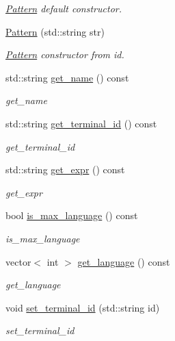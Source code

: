 \begin{DoxyCompactItemize}
\begin{DoxyCompactList}\small\item\em \hyperlink{class_pattern}{Pattern} default constructor. \end{DoxyCompactList}\item 
\hyperlink{class_pattern_a13a6b021ad96f605132817bc09067fb5}{Pattern} (std\+::string str)
\begin{DoxyCompactList}\small\item\em \hyperlink{class_pattern}{Pattern} constructor from id. \end{DoxyCompactList}\item 
std\+::string \hyperlink{class_pattern_a46de2634013b74dd9eb6c5b4b9221207}{get\+\_\+name} () const 
\begin{DoxyCompactList}\small\item\em get\+\_\+name \end{DoxyCompactList}\item 
std\+::string \hyperlink{class_pattern_a70a07c4f18a44547451a7a31cb4f559b}{get\+\_\+terminal\+\_\+id} () const 
\begin{DoxyCompactList}\small\item\em get\+\_\+terminal\+\_\+id \end{DoxyCompactList}\item 
std\+::string \hyperlink{class_pattern_aae66f42063f4f6eac934995201f77a64}{get\+\_\+expr} () const 
\begin{DoxyCompactList}\small\item\em get\+\_\+expr \end{DoxyCompactList}\item 
bool \hyperlink{class_pattern_ac0b9bfafaea69a90627843c8f43aa71f}{is\+\_\+max\+\_\+language} () const 
\begin{DoxyCompactList}\small\item\em is\+\_\+max\+\_\+language \end{DoxyCompactList}\item 
vector$<$ int $>$ \hyperlink{class_pattern_ad3330677dbf1c9bd66a1ee3f79cb499f}{get\+\_\+language} () const 
\begin{DoxyCompactList}\small\item\em get\+\_\+language \end{DoxyCompactList}\item 
void \hyperlink{class_pattern_a4517fb348f3bd3ba9453e1ef39d6ed84}{set\+\_\+terminal\+\_\+id} (std\+::string id)
\begin{DoxyCompactList}\small\item\em set\+\_\+terminal\+\_\+id \end{DoxyCompactList}\item 

\end{DoxyCompactItemize}
